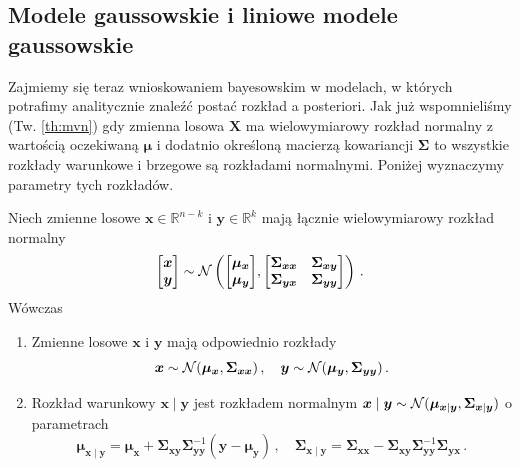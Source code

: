 \documentclass{myclass}
\numberwithin{equation}{subsection}
\begin{document}
\subsection{Modele gaussowskie i liniowe modele gaussowskie}

Zajmiemy się teraz wnioskowaniem bayesowskim w modelach, w których potrafimy analitycznie znaleźć
postać rozkład a posteriori. Jak już wspomnieliśmy (Tw. \ref{th:mvn}) gdy zmienna losowa \(\bm{X}\)
ma wielowymiarowy rozkład normalny z wartością oczekiwaną \(\bm{\mu}\) i dodatnio określoną macierzą
kowariancji \(\bm{\Sigma}\) to wszystkie rozkłady warunkowe i brzegowe są rozkładami normalnymi.
Poniżej wyznaczymy parametry tych rozkładów.

\begin{theorem}\label{th:gauss_model} Niech zmienne losowe \(\bm{x} \in \mathbb{R}^{n-k}\) i
\(\bm{y} \in \mathbb{R}^k\) mają łącznie wielowymiarowy rozkład normalny
\begin{equation*}
    \mqty[\bm{x} \\ \bm{y}] \sim \mc{N}\left(\mqty[\bm{\mu}_{\bm{x}} \\ \bm{\mu}_{\bm{y}}], \mqty[\bm{\Sigma}_{\bm{xx}} & \bm{\Sigma}_{\bm{xy}} \\ \bm{\Sigma}_{\bm{yx}} & \bm{\Sigma}_{\bm{yy}}] \right)\,.
\end{equation*} 
Wówczas
\begin{enumerate}
    
    \item Zmienne losowe \(\bm{x}\) i \(\bm{y}\) mają odpowiednio rozkłady
    \begin{equation*}
        \bm{x} \sim \mathcal{N}(\bm{\mu}_{\bm{x}}, \bm{\Sigma}_{\bm{xx}})\,,\quad \bm{y} \sim \mathcal{N}(\bm{\mu}_{\bm{y}}, \bm{\Sigma}_{\bm{yy}})\,.
    \end{equation*}

    \item Rozkład warunkowy \(\bm{x} \mid \bm{y}\) jest rozkładem normalnym \(\bm{x} \mid \bm{y}
    \sim \mathcal{N}(\bm{\mu}_{\bm{x}\mid\bm{y}}, \bm{\Sigma}_{\bm{x}\mid\bm{y}})\) o parametrach
    \begin{equation*}
        \bm{\mu}_{\bm{x}\mid\bm{y}} = \bm{\mu}_{\bm{x}} + \bm{\Sigma}_{\bm{xy}}\bm{\Sigma}_{\bm{yy}}^{-1}(\bm{y} - \bm{\mu}_{\bm{y}})\,,\quad \bm{\Sigma}_{\bm{x}\mid\bm{y}} = \bm{\Sigma}_{\bm{xx}} - \bm{\Sigma}_{\bm{xy}}\bm{\Sigma}_{\bm{yy}}^{-1}\bm{\Sigma}_{\bm{yx}}\,.
    \end{equation*}
\end{enumerate}
\end{theorem}
\end{document}
